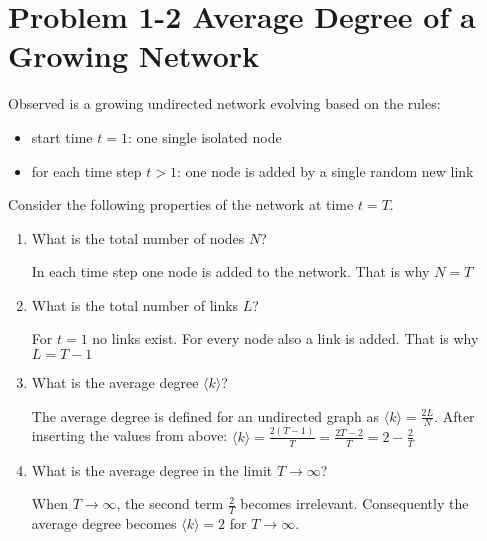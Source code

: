 \section{Problem 1-2 Average Degree of a Growing Network}

Observed is a growing undirected network evolving based on the rules:
\begin{itemize}
	\item start time $t=1$: one single isolated node
	\item for each time step $t>1$: one node is added by a single random new link
\end{itemize}

Consider the following properties of the network at time $t=T$.

\begin{enumerate}
	\item What is the total number of nodes $N$?
	
	In each time step one node is added to the network. That is why $N=T$
	
	\item What is the total number of links $L$?
	
	For $t=1$ no links exist. For every node also a link is added. That is why $L=T-1$
	
	\item What is the average degree $\langle k \rangle$?
	
	The average degree is defined for an undirected graph as $\langle k \rangle = \frac{2L}{N}$. After inserting the values from above: $\langle k \rangle = \frac{2(T-1)}{T} = \frac{2T-2}{T} = 2 - \frac{2}{T} $
	
	\item What is the average degree in the limit $T \rightarrow \infty$?
	
	When $T \rightarrow \infty$, the second term $\frac{2}{T}$ becomes irrelevant. Consequently the average degree becomes $\langle k \rangle = 2$ for $T \rightarrow \infty$.
	
\end{enumerate}